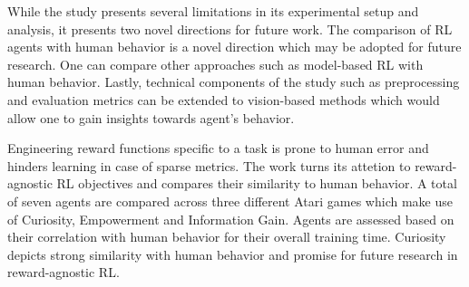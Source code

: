 \documentclass[11pt,letterpaper]{article}
\begin{document}
While the study presents several limitations in its experimental setup and analysis, it presents two novel directions for future work. The comparison of RL agents with human behavior is a novel direction which may be adopted for future research. One can compare other approaches such as model-based RL with human behavior. Lastly, technical components of the study such as preprocessing and evaluation metrics can be extended to vision-based methods which would allow one to gain insights towards agent's behavior. 

Engineering reward functions specific to a task is prone to human error and hinders learning in case of sparse metrics. The work turns its attetion to reward-agnostic RL objectives and compares their similarity to human behavior. A total of seven agents are compared across three different Atari games which make use of Curiosity, Empowerment and Information Gain. Agents are assessed based on their correlation with human behavior for their overall training time. Curiosity depicts strong similarity with human behavior and promise for future research in reward-agnostic RL. 
\end{document}
